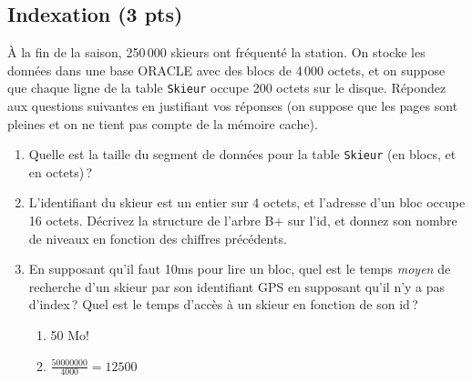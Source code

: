 \subsection*{Indexation (3 pts)}

\`A la fin de la saison, 250\,000 skieurs
ont fréquenté la station. On stocke
les données dans une base ORACLE avec des blocs
de 4\,000 octets, et on 
suppose que chaque ligne de la table \texttt{Skieur} occupe
200 octets sur le disque. 
 Répondez aux questions suivantes en justifiant
    vos réponses (on suppose que les pages sont pleines
   et on ne tient pas compte de la mémoire cache).
  \begin{enumerate}
   \item Quelle est la taille du segment de données pour 
           la table \texttt{Skieur} (en blocs, et en octets)\,? 


  \item L'identifiant du skieur est un entier sur 4 octets,
         et l'adresse d'un bloc occupe 16 octets. Décrivez
          la structure de l'arbre B+ sur l'id, et donnez son nombre de niveaux
         en fonction des chiffres précédents. 

  \item En supposant qu'il faut 10ms pour lire un bloc, 
         quel est le temps {\em moyen} de recherche d'un skieur
         par son identifiant GPS en supposant qu'il n'y a pas d'index\,?
       Quel est le temps d'accès à un skieur en fonction de son id\,?

\begin{solution}
\begin{enumerate}
  \item 50 Mo!
  \item $\frac{50000000}{4000}=12500$
\end{enumerate}
\end{solution}
 \begin{solution}
 

\end{solution}
\end{enumerate}
